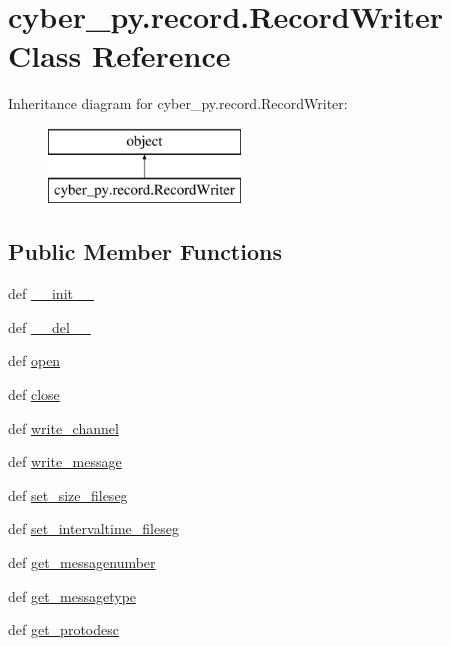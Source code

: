 \hypertarget{classcyber__py_1_1record_1_1RecordWriter}{\section{cyber\-\_\-py.\-record.\-Record\-Writer Class Reference}
\label{classcyber__py_1_1record_1_1RecordWriter}
}
Inheritance diagram for cyber\-\_\-py.\-record.\-Record\-Writer\-:\begin{figure}[H]
\begin{center}
\leavevmode
\includegraphics[height=2.000000cm]{classcyber__py_1_1record_1_1RecordWriter}
\end{center}
\end{figure}
\subsection*{Public Member Functions}
\begin{DoxyCompactItemize}
\item 
def \hyperlink{classcyber__py_1_1record_1_1RecordWriter_a14355714b318d04fb18339670b9bcb82}{\-\_\-\-\_\-init\-\_\-\-\_\-}
\item 
def \hyperlink{classcyber__py_1_1record_1_1RecordWriter_a03d3d431dedf40f2a865cc6caedc27b6}{\-\_\-\-\_\-del\-\_\-\-\_\-}
\item 
def \hyperlink{classcyber__py_1_1record_1_1RecordWriter_a1611664ff3f964ccd5821b0c5a2a8a85}{open}
\item 
def \hyperlink{classcyber__py_1_1record_1_1RecordWriter_a4876cf6805312cfd344e12e6474f72ae}{close}
\item 
def \hyperlink{classcyber__py_1_1record_1_1RecordWriter_a4cc5a7287e73a42fa9bf4bbca226e84f}{write\-\_\-channel}
\item 
def \hyperlink{classcyber__py_1_1record_1_1RecordWriter_a418eef3592ac895d1c57d127a3d979d2}{write\-\_\-message}
\item 
def \hyperlink{classcyber__py_1_1record_1_1RecordWriter_adf89b0a90fda34422edb0b5a36d7066a}{set\-\_\-size\-\_\-fileseg}
\item 
def \hyperlink{classcyber__py_1_1record_1_1RecordWriter_ae03b486b593d1818b06a9f9b7c45bdea}{set\-\_\-intervaltime\-\_\-fileseg}
\item 
def \hyperlink{classcyber__py_1_1record_1_1RecordWriter_a4e13eb41d36533dbaeedf7ec135576a9}{get\-\_\-messagenumber}
\item 
def \hyperlink{classcyber__py_1_1record_1_1RecordWriter_aaa2ebabc7fa95b2cf789f520e9b7a8a3}{get\-\_\-messagetype}
\item 
def \hyperlink{classcyber__py_1_1record_1_1RecordWriter_aae735e92351317e894f403ed542313ec}{get\-\_\-protodesc}
\end{DoxyCompactItemize}
